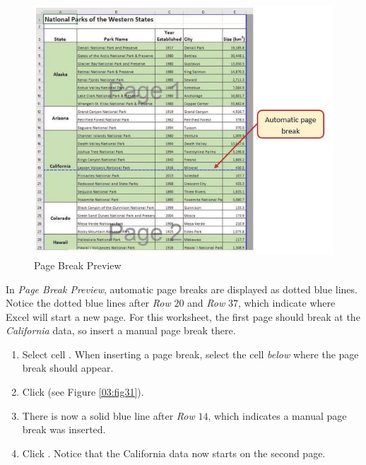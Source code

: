 \begin{figure}[H]
	\centering
	\includegraphics[width=\maxwidth{.95\linewidth}]{gfx/ch03_fig30}
	\caption{Page Break Preview}
	\label{03:fig30}
\end{figure}

In \textit{Page Break Preview}, automatic page breaks are displayed as dotted blue lines. Notice the dotted blue lines after \textit{Row} $ 20 $ and \textit{Row} $ 37 $, which indicate where Excel will start a new page. For this worksheet, the first page should break at the \textit{California} data, so insert a manual page break there.

\begin{enumbox}
	\begin{enumerate}
		\item Select cell . When inserting a page break, select the cell \textit{below} where the page break should appear.
		\item Click  (see Figure \ref{03:fig31}).
		\item There is now a solid blue line after \textit{Row} $ 14 $, which indicates a manual page break was inserted.
		\item Click . Notice that the California data now starts on the second page.
	\end{enumerate}
\end{enumbox}
	
